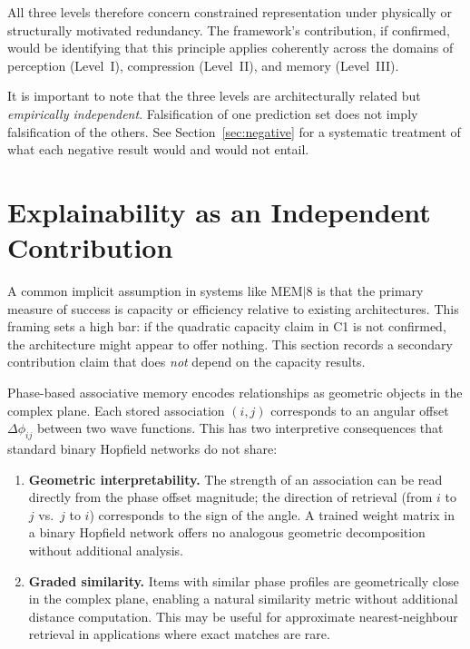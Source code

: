 \documentclass[11pt, a4paper]{article}
\newcommand{\mem}{MEM$|$8}
\begin{document}
All three levels therefore concern constrained representation under physically or
structurally motivated redundancy.  The framework's contribution, if confirmed,
would be identifying that this principle applies coherently across the domains of
perception (Level~I), compression (Level~II), and memory (Level~III).

It is important to note that the three levels are architecturally related but
\emph{empirically independent}.  Falsification of one prediction set does not
imply falsification of the others.  See Section~\ref{sec:negative} for a systematic
treatment of what each negative result would and would not entail.

\section{Explainability as an Independent Contribution}

A common implicit assumption in systems like \mem{} is that the primary measure
of success is capacity or efficiency relative to existing architectures.  This
framing sets a high bar: if the quadratic capacity claim in C1 is not confirmed,
the architecture might appear to offer nothing.  This section records a secondary
contribution claim that does \emph{not} depend on the capacity results.

Phase-based associative memory encodes relationships as geometric objects in the
complex plane.  Each stored association $(i, j)$ corresponds to an angular offset
$\Delta\phi_{ij}$ between two wave functions.  This has two interpretive
consequences that standard binary Hopfield networks do not share:

\begin{enumerate}
  \item \textbf{Geometric interpretability.}  The strength of an association can
    be read directly from the phase offset magnitude; the direction of retrieval
    (from $i$ to $j$ vs.\ $j$ to $i$) corresponds to the sign of the angle.
    A trained weight matrix in a binary Hopfield network offers no analogous
    geometric decomposition without additional analysis.

  \item \textbf{Graded similarity.}  Items with similar phase profiles are
    geometrically close in the complex plane, enabling a natural similarity metric
    without additional distance computation.  This may be useful for approximate
    nearest-neighbour retrieval in applications where exact matches are rare.
\end{enumerate}
\end{document}
